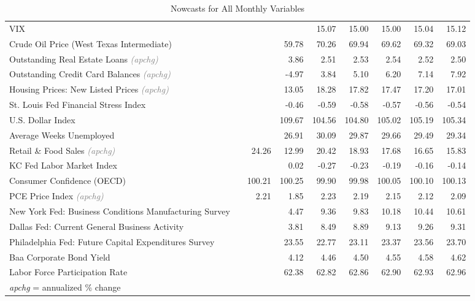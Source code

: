 \documentclass[11pt, letterpaper]{article}\usepackage[]{graphicx}\usepackage[]{color}
\begin{document}
\begin{table}[H]
\begin{tabular}{lrrrrrrrr}
  VIX &  &  &  & 15.07 & 15.00 & 15.00 & 15.04 & 15.12 \\ 
  Crude Oil Price (West Texas Intermediate) &  &  & 59.78 & 70.26 & 69.94 & 69.62 & 69.32 & 69.03 \\ 
  Outstanding Real Estate Loans \textit{\footnotesize\textcolor{gray}{(apchg)}} &  &  & 3.86 & 2.51 & 2.53 & 2.54 & 2.52 & 2.50 \\ 
  Outstanding Credit Card Balances \textit{\footnotesize\textcolor{gray}{(apchg)}} &  &  & -4.97 & 3.84 & 5.10 & 6.20 & 7.14 & 7.92 \\ 
  Housing Prices: New Listed Prices \textit{\footnotesize\textcolor{gray}{(apchg)}} &  &  & 13.05 & 18.28 & 17.82 & 17.47 & 17.20 & 17.01 \\ 
  St. Louis Fed Financial Stress Index &  &  & -0.46 & -0.59 & -0.58 & -0.57 & -0.56 & -0.54 \\ 
  U.S. Dollar Index &  &  & 109.67 & 104.56 & 104.80 & 105.02 & 105.19 & 105.34 \\ 
  Average Weeks Unemployed &  &  & 26.91 & 30.09 & 29.87 & 29.66 & 29.49 & 29.34 \\ 
  Retail \& Food Sales \textit{\footnotesize\textcolor{gray}{(apchg)}} &  & 24.26 & 12.99 & 20.42 & 18.93 & 17.68 & 16.65 & 15.83 \\ 
  KC Fed Labor Market Index &  &  & 0.02 & -0.27 & -0.23 & -0.19 & -0.16 & -0.14 \\ 
  Consumer Confidence (OECD) &  & 100.21 & 100.25 & 99.90 & 99.98 & 100.05 & 100.10 & 100.13 \\ 
  PCE Price Index \textit{\footnotesize\textcolor{gray}{(apchg)}} &  & 2.21 & 1.85 & 2.23 & 2.19 & 2.15 & 2.12 & 2.09 \\ 
  New York Fed: Business Conditions Manufacturing Survey &  &  & 4.47 & 9.36 & 9.83 & 10.18 & 10.44 & 10.61 \\ 
  Dallas Fed: Current General Business Activity &  &  & 3.81 & 8.49 & 8.89 & 9.13 & 9.26 & 9.31 \\ 
  Philadelphia Fed: Future Capital Expenditures Survey &  &  & 23.55 & 22.77 & 23.11 & 23.37 & 23.56 & 23.70 \\ 
  Baa Corporate Bond Yield &  &  & 4.12 & 4.46 & 4.50 & 4.55 & 4.58 & 4.62 \\ 
  Labor Force Participation Rate &  &  & 62.38 & 62.82 & 62.86 & 62.90 & 62.93 & 62.96 \\ 
   \hline 
 \textit{apchg} = annualized \% change 
\end{tabular}
\endgroup
\caption{Nowcasts for All Monthly Variables} 
\end{table}
\end{document}
